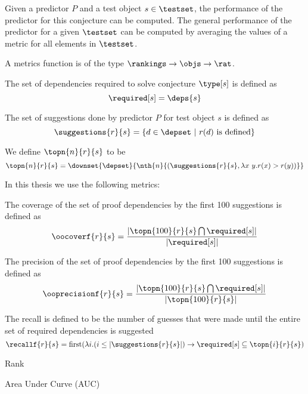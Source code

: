 Given a predictor $P$ and a test object $s \in \testset$,
the performance of the predictor for this conjecture can be computed.
The general performance of the predictor for a given $\testset$
can be computed by averaging the values of a metric for all elements in $\testset$.

\begin{definition}
  A metrics function is of the type $\rankings \rightarrow \objs \rightarrow \rat$.
\end{definition}

\begin{definition} The set of dependencies required to solve conjecture $\type[s]$ is defined as
  \[ \required[s] = \deps{s} \]
\end{definition}

\begin{definition} The set of suggestions done by predictor $P$ for test object $s$ is defined as
  \[ \suggestions{r}{s} = \{ d \in \depset ~|~ r(d) ~\text{is defined} \} \]
\end{definition}

\begin{definition} We define $\topn{n}{r}{s}$ to be
  \[ \topn{n}{r}{s} = \downset{\depset}{\nth{n}{(\suggestions{r}{s}, \lambda x~y. r(x) > r(y))}} \]
\end{definition}

In this thesis we use the following metrics:
\begin{definition}
  The coverage of the set of proof dependencies by the first 100 suggestions is defined as
  \[ \oocoverf{r}{s} = \frac{ |\topn{100}{r}{s} \bigcap \required[s]| } { |\required[s]| } \]
\end{definition}

\begin{definition}
  The precision of the set of proof dependencies by the first 100 suggestions is defined as
  \[ \ooprecisionf{r}{s} = \frac{ |\topn{100}{r}{s} \bigcap \required[s]| } { |\topn{100}{r}{s}| } \]
\end{definition}

\begin{definition}
  The recall is defined to be the number of guesses that were made until the entire set of required dependencies is suggested
  \[ \recallf{r}{s} =  \text{first}(\lambda i. (i \leq |\suggestions{r}{s}|) \rightarrow \required[s] \subseteq \topn{i}{r}{s}) \]
\end{definition}

\begin{definition}{Rank}
\end{definition}

\begin{definition}{Area Under Curve (AUC)}
\end{definition}
